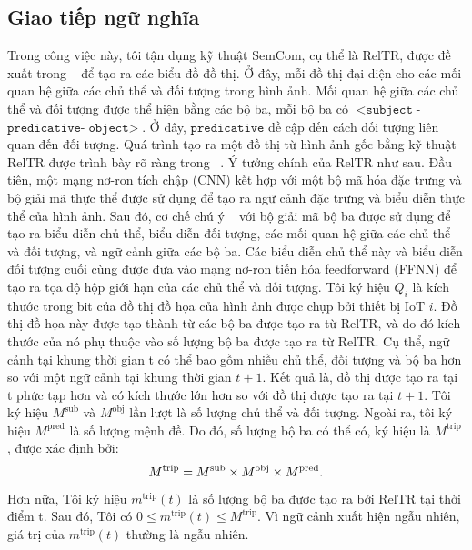 \documentclass{article} %
\begin{document}
\subsection{Giao tiếp ngữ nghĩa}
Trong công việc này, tôi tận dụng kỹ thuật SemCom, cụ thể là RelTR, được đề xuất trong ~\cite{cong2022reltr} để tạo ra các biểu đồ đồ thị. Ở đây, mỗi đồ thị đại diện cho các mối quan hệ giữa các chủ thể và đối tượng trong hình ảnh. Mối quan hệ giữa các chủ thể và đối tượng được thể hiện bằng các bộ ba, mỗi bộ ba có $<\texttt{subject}$-$\texttt{predicative}$-$\texttt{object}>$. Ở đây, $\texttt{predicative}$ đề cập đến cách đối tượng liên quan đến đối tượng. Quá trình tạo ra một đồ thị từ hình ảnh gốc bằng kỹ thuật RelTR được trình bày rõ ràng trong ~\cite{cong2022reltr}. Ý tưởng chính của RelTR như sau. Đầu tiên, một mạng nơ-ron tích chập (CNN) kết hợp với một bộ mã hóa đặc trưng và bộ giải mã thực thể được sử dụng để tạo ra ngữ cảnh đặc trưng và biểu diễn thực thể của hình ảnh. Sau đó, cơ chế chú ý ~\cite{vaswani2017attention} với bộ giải mã bộ ba được sử dụng để tạo ra biểu diễn chủ thể, biểu diễn đối tượng, các mối quan hệ giữa các chủ thể và đối tượng, và ngữ cảnh giữa các bộ ba. Các biểu diễn chủ thể này và biểu diễn đối tượng cuối cùng được đưa vào mạng nơ-ron tiến hóa feedforward (FFNN) để tạo ra tọa độ hộp giới hạn của các chủ thể và đối tượng.
Tôi ký hiệu $Q_i$ là kích thước trong bit của đồ thị đồ họa của hình ảnh được chụp bởi thiết bị IoT $i$. Đồ thị đồ họa này được tạo thành từ các bộ ba được tạo ra từ RelTR, và do đó kích thước của nó phụ thuộc vào số lượng bộ ba được tạo ra từ RelTR. Cụ thể, ngữ cảnh tại khung thời gian t có thể bao gồm nhiều chủ thể, đối tượng và bộ ba hơn so với một ngữ cảnh tại khung thời gian $t+1$. Kết quả là, đồ thị được tạo ra tại t phức tạp hơn và có kích thước lớn hơn so với đồ thị được tạo ra tại $t+1$. Tôi ký hiệu $M^{\mathrm{sub}}$ và $M^{\mathrm{obj}}$ lần lượt là số lượng chủ thể và đối tượng. Ngoài ra, tôi ký hiệu $M^{\mathrm{pred}}$  là số lượng mệnh đề. Do đó, số lượng bộ ba có thể có, ký hiệu là $M^{\mathrm{trip}}$ , được xác định bởi:
\begin{equation}
M^{\rm{trip}}=M^{\rm{sub}} \times M^{\rm{obj}} \times M^{\rm{pred}}.
\end{equation}
Hơn nữa, Tôi ký hiệu $m^{\mathrm{trip}}\left(t\right)$  là số lượng bộ ba được tạo ra bởi RelTR tại thời điểm t. Sau đó, Tôi có $0\le m^{\mathrm{trip}}\left(t\right)\le M^{\mathrm{trip}}$. Vì ngữ cảnh xuất hiện ngẫu nhiên, giá trị của $m^{\mathrm{trip}}\left(t\right)$  thường là ngẫu nhiên.
\end{document}
